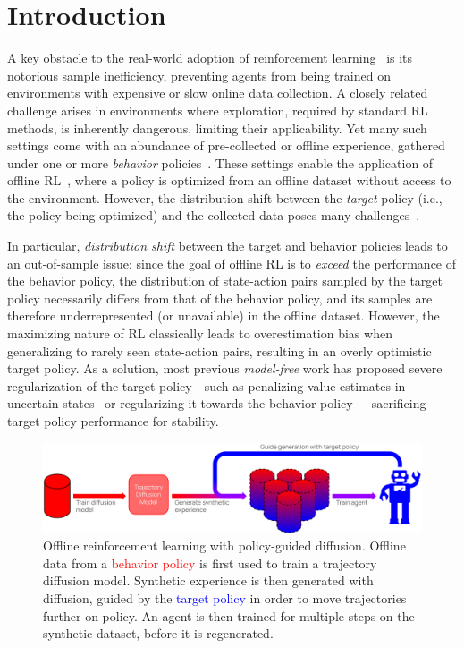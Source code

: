 \documentclass[10pt]{article} %
\theoremstyle{plain}
\theoremstyle{definition}
\theoremstyle{remark}
\begin{document}
\section{Introduction}
\label{intro}
A key obstacle to the real-world adoption of reinforcement learning~\citep[RL,][]{Sutton1998} is its notorious sample inefficiency, preventing agents from being trained on environments with expensive or slow online data collection.
A closely related challenge arises in environments where exploration, required by standard RL methods, is inherently dangerous, limiting their applicability.
Yet many such settings come with an abundance of pre-collected or offline experience, gathered under one or more \textit{behavior} policies~\citep{mopo}.
These settings enable the application of offline RL~\citep{levine2020offline}, where a policy is optimized from an offline dataset without access to the environment.
However, the distribution shift between the \textit{target} policy (i.e., the policy being optimized) and the collected data poses many challenges~\citep{kumar2020conservative, kostrikov2021offline, bcq}.


In particular, \textit{distribution shift} between the target and behavior policies leads to an out-of-sample issue: since the goal of offline RL is to \textit{exceed} the performance of the behavior policy, the distribution of state-action pairs sampled by the target policy necessarily differs from that of the behavior policy, and its samples are therefore underrepresented (or unavailable) in the offline dataset.
However, the maximizing nature of RL classically leads to overestimation bias when generalizing to rarely seen state-action pairs, resulting in an overly optimistic target policy.
As a solution, most previous \textit{model-free} work has proposed severe regularization of the target policy---such as penalizing value estimates in uncertain states~\citep{kumar2020conservative, an2021uncertainty} or regularizing it towards the behavior policy~\citep{fujimoto2021minimalist}---sacrificing target policy performance for stability.


\begin{figure}[t!]
\centering
\includegraphics[width=\textwidth]{figs/overview.png}
\vspace{-4mm}
\caption{
Offline reinforcement learning with policy-guided diffusion. Offline data from a \textcolor{red}{behavior policy} is first used to train a trajectory diffusion model. Synthetic experience is then generated with diffusion, guided by the \textcolor{blue}{target policy} in order to move trajectories further on-policy. An agent is then trained for multiple steps on the synthetic dataset, before it is regenerated.
}
\vspace{-4mm}
\label{fig:overview}
\end{figure}
\end{document}

